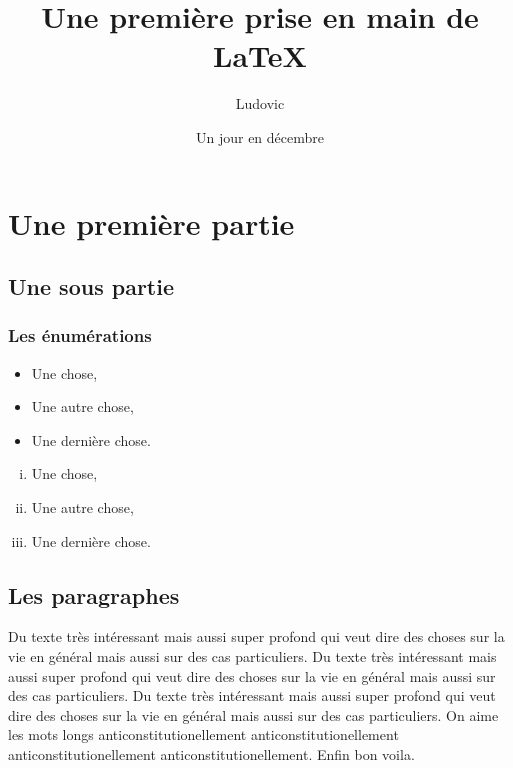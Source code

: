 \documentclass[a4paper, twoside, onecolumn, 10pt]{article}
\author{Ludovic}
\title{Une première prise en main de \LaTeX}
\date{Un jour en décembre}
\begin{document}
\maketitle %


\tableofcontents %


\section{Une première partie} %

\subsection{Une sous partie}

\subsubsection{Les énumérations}

\begin{itemize}
\item Une chose,
\item Une autre chose,
\item Une dernière chose.
\end{itemize}

\begin{enumerate}[i)]
\item Une chose,
\item Une autre chose,
\item Une dernière chose.
\end{enumerate}

\subsection{Les paragraphes}

Du texte très intéressant mais aussi super profond qui veut dire des choses sur la vie en général mais aussi sur des cas particuliers. 
Du texte très intéressant mais aussi super profond qui veut dire des choses sur la vie en général mais aussi sur des cas particuliers.
Du texte très intéressant mais aussi super profond qui veut dire des choses sur la vie en général mais aussi sur des cas particuliers.
On aime les mots longs anticonstitutionellement anticonstitutionellement anticonstitutionellement anticonstitutionellement.
Enfin bon voila.

\end{document}
